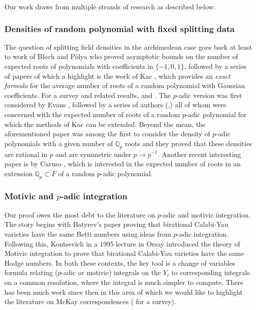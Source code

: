 \documentclass[10pt]{article}
\theoremstyle{plain}
\theoremstyle{definition}
\numberwithin{equation}{section}
\begin{document}
Our work draws from multiple strands of research as described below.

\subsubsection*{Densities of random polynomial with fixed splitting data} 

The question of splitting field densities in the archimedean case goes back at least to work of Bloch and P\"olya \cite{bloch1932roots} who proved asymptotic bounds on the number of expected roots of polynomials with coefficients in $\{-1,0,1\}$, followed by a series of papers of which a highlight is the work of Kac \cite{kac1943average}, which provides an \emph{exact formula} for the average number of roots of a random polynomial with Gaussian coefficients. For a survey and related results, \cite{dembo2002random} and \cite{nguyen2021random}. The $p$-adic version was first considered by Evans \cite{evans2006expected}, followed by a series of authors (\cite{buhler2006probability},\cite{kulkarni2021p}) all of whom were concerned with the expected number of roots of a random $p$-adic polynomial for which the methods of Kac can be extended. Beyond the mean, the aforementioned paper \cite{bhargava2022density} was among the first to consider the density of $p$-adic polynomials with a given number of $\mathbb Q_p$ roots and they proved that these densities are rational in $p$ and are symmetric under $p \to p^{-1}$. Another recent interesting paper is by Caruso \cite{caruso2022zeroes}, which is interested in the expected number of roots in an extension $\mathbb Q_p \subset F$ of a random $p$-adic polynomial.

\subsubsection*{Motivic and $p$-adic integration}

Our proof owes the most debt to the literature on $p$-adic and motivic integration. The story begins with Batyrev's paper \cite{batyrev1997birational} proving that birational Calabi-Yau varieties have the same Betti numbers using ideas from $p$-adic integration. Following this, Kontsevich in a 1995 lecture in Orsay introduced the theory of Motivic integration to prove that birational Calabi-Yau varieties have the same Hodge numbers. In both these contexts, the key tool is a change of variables formula relating ($p$-adic or motivic) integrals on the $Y_i$ to corresponding integrals on a common resolution, where the integral is much simpler to compute. There has been much work since then in this area of which we would like to highlight the literature on McKay correspondences (\cite{reid2002correspondance} for a survey).
\end{document}
